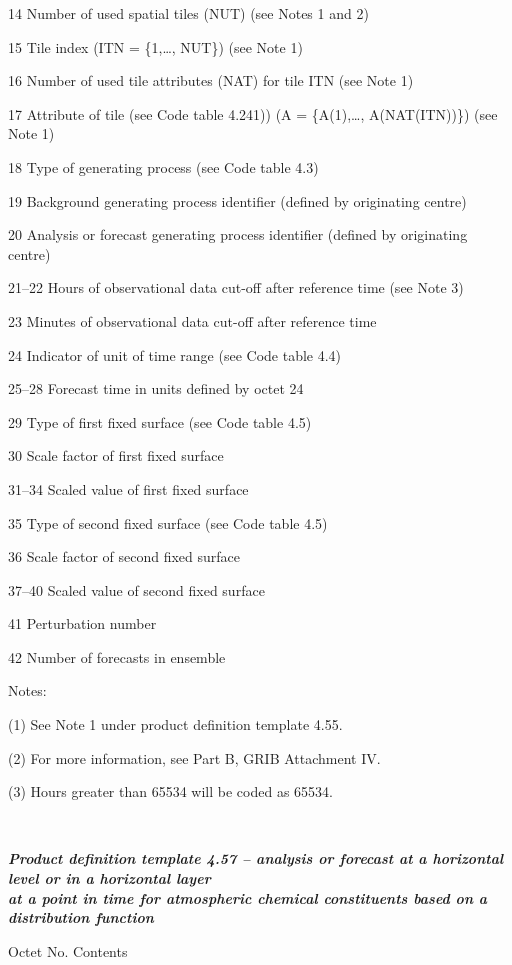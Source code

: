 14 Number of used spatial tiles (NUT) (see Notes 1 and 2)

15 Tile index (ITN = \{1,\ldots, NUT\}) (see Note 1)

16 Number of used tile attributes (NAT) for tile ITN (see Note 1)

17 Attribute of tile (see Code table 4.241)) (A = \{A(1),\ldots, A(NAT(ITN))\}) (see Note 1)

18 Type of generating process (see Code table 4.3)

19 Background generating process identifier (defined by originating centre)

20 Analysis or forecast generating process identifier (defined by originating centre)

21--22 Hours of observational data cut-off after reference time (see Note 3)

23 Minutes of observational data cut-off after reference time

24 Indicator of unit of time range (see Code table 4.4)

25--28 Forecast time in units defined by octet 24

29 Type of first fixed surface (see Code table 4.5)

30 Scale factor of first fixed surface

31--34 Scaled value of first fixed surface

35 Type of second fixed surface (see Code table 4.5)

36 Scale factor of second fixed surface

37--40 Scaled value of second fixed surface

41 Perturbation number

42 Number of forecasts in ensemble

Notes:

(1) See Note 1 under product definition template 4.55.

(2) For more information, see Part B, GRIB Attachment IV.

(3) Hours greater than 65534 will be coded as 65534.

\emph{\textbf{\\
}}

\emph{\textbf{Product definition template 4.57 -- analysis or forecast at a horizontal level or in a horizontal layer\\
at a point in time for atmospheric chemical constituents based on a distribution function}}

Octet No. Contents

